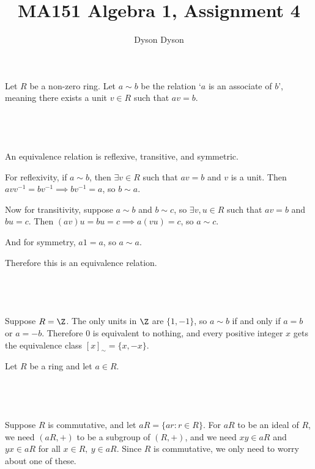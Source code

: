 \documentclass[a4paper]{article}
\title{MA151 Algebra 1, Assignment 4}
\author{Dyson Dyson}
\date{}
\begin{document}
\maketitle

\setlength{\parindent}{0em}
\setlength{\parskip}{1em}


Let $R$ be a non-zero ring. Let $a \sim b$ be the relation \enquote*{$a$ is an associate of $b$}, meaning there exists a unit $v \in R$ such that $av = b$.

\subsection{~}

An equivalence relation is reflexive, transitive, and symmetric.

For reflexivity, if $a \sim b$, then $\exists v \in R$ such that $av = b$ and $v$ is a unit. Then $a v v^{-1} = b v^{-1} \implies b v^{-1} = a$, so $b \sim a$.

Now for transitivity, suppose $a \sim b$ and $b \sim c$, so $\exists v, u \in R$ such that $av = b$ and $bu = c$. Then $(av) u = bu = c \implies a (vu) = c$, so $a \sim c$.

And for symmetry, $a 1 = a$, so $a \sim a$.

Therefore this is an equivalence relation.

\subsection{~}

Suppose $R = \Z$. The only units in $\Z$ are $\{1, -1\}$, so $a \sim b$ if and only if $a = b$ or $a = -b$. Therefore $0$ is equivalent to nothing, and every positive integer $x$ gets the equivalence class $[x]_\sim = \{x, -x\}$.


Let $R$ be a ring and let $a \in R$.

\subsection{~}

Suppose $R$ is commutative, and let $aR = \{ar : r \in R\}$. For $aR$ to be an ideal of $R$, we need $(aR, +)$ to be a subgroup of $(R, +)$, and we need $xy \in aR$ and $yx \in aR$ for all $x \in R,\ y \in aR$. Since $R$ is commutative, we only need to worry about one of these.
\end{document}
